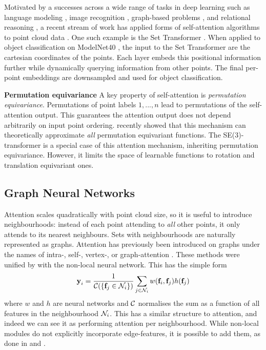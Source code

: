 \documentclass{article}
\begin{document}
Motivated by a successes across a wide range of tasks in deep learning such as language modeling \citep{VaswaniSPUJGKP17}, image recognition \citep{ParmarRVBLS19}, graph-based problems \citep{VelikovicCCRLB2017}, and relational reasoning \citep{steenkiste2018relational,Mohart}, 
a recent stream of work has applied forms of self-attention algorithms to point cloud data \citep{Yang2019, ShapeContextNet, SetTransformer}.
One such example is the Set Transformer \citep{SetTransformer}. When applied to object classification on ModelNet40 \citep{modelnet40}, the input to the Set Transformer are the cartesian coordinates of the points. Each layer embeds this positional information further while dynamically querying information from other points. The final per-point embeddings are downsampled and used for object classification.

\textbf{Permutation equivariance}
A key property of self-attention is \emph{permutation equivariance}. Permutations of point labels $1,...,n$ lead to permutations of the self-attention output. This guarantees the attention output does not depend arbitrarily on input point ordering. \citet{Wagstaff2019} recently showed that this mechanism can theoretically approximate \textit{all} permutation equivariant functions. The SE(3)-transformer is a special case of this attention mechanism, inheriting permutation equivariance.
However, it limits the space of learnable functions to rotation and translation equivariant ones.

\subsection{Graph Neural Networks}

Attention scales quadratically with point cloud size, so it is useful to introduce neighbourhoods: instead of each point attending to \textit{all} other points, it only attends to its nearest neighbours. Sets with neighbourhoods are naturally represented as graphs. Attention has previously been introduced on graphs under the names of intra-, self-, vertex-, or graph-attention \citep{lin2017structured, VaswaniSPUJGKP17, VelikovicCCRLB2017, hoshen2017vain, shaw2018selfattention}. These methods were unified by \citet{wang2017nonlocal} with the non-local neural network. This has the simple form
\begin{align}
    \textbf{y}_i = \frac{1}{\mathcal{C}(\{\textbf{f}_j \in \mathcal{N}_i\})}\sum_{j\in\mathcal{N}_i} w(\textbf{f}_i, \textbf{f}_j) h(\textbf{f}_j) \label{eq:nonlocal}
\end{align}
where $w$ and $h$ are neural networks and $\mathcal{C}$ normalises the sum as a function of all features in the neighbourhood $\mathcal{N}_i$. This has a similar structure to attention, and indeed we can see it as performing attention per neighbourhood. While non-local modules do not explicitly incorporate edge-features, it is possible to add them, as done in \citet{VelikovicCCRLB2017} and \citet{hoshen2017vain}.
\end{document}
